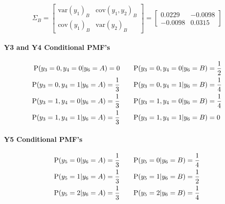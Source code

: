 \documentclass[12pt]{article}
\begin{document}
\begin{enumerate}[leftmargin=\labelsep]
\begin{enumerate}
        \begin{equation}
            \Sigma_B =
            \begin{bmatrix}
                \textrm{var}(y_1)_B & \textrm{cov}(y_1, y_2)_B \\
                \textrm{cov}(y_1)_B & \textrm{var}(y_2)_B
            \end{bmatrix}=
            \begin{bmatrix}
                0.0229 & -0.0098 \\
                -0.0098 & 0.0315
            \end{bmatrix}
        \end{equation}

        \paragraph{Y3 and Y4 Conditional PMF's}

        \begin{equation}
        \begin{split}
            \textrm{P}(y_3 = 0, y_4 = 0 | y_6 = A) = 0 &\qquad \textrm{P}(y_3 = 0, y_4 = 0 | y_6 = B) = \frac{1}{2} \\
            \textrm{P}(y_3 = 0, y_4 = 1 | y_6 = A) = \frac{1}{3} &\qquad \textrm{P}(y_3 = 0, y_4 = 1 | y_6 = B) = \frac{1}{4} \\
            \textrm{P}(y_3 = 1, y_4 = 0 | y_6 = A) = \frac{1}{3} &\qquad \textrm{P}(y_3 = 1, y_4 = 0 | y_6 = B) = \frac{1}{4} \\
            \textrm{P}(y_3 = 1, y_4 = 1 | y_6 = A) = \frac{1}{3} &\qquad \textrm{P}(y_3 = 1, y_4 = 1 | y_6 = B) = 0
        \end{split}
        \end{equation}

        \paragraph{Y5 Conditional PMF's}

        \begin{equation}
        \begin{split}
            \textrm{P}(y_5 = 0 | y_6 = A) = \frac{1}{3} &\qquad \textrm{P}(y_5 = 0 | y_6 = B) = \frac{1}{4} \\
            \textrm{P}(y_5 = 1 | y_6 = A) = \frac{1}{3} &\qquad \textrm{P}(y_5 = 1 | y_6 = B) = \frac{1}{2} \\
            \textrm{P}(y_5 = 2 | y_6 = A) = \frac{1}{3} &\qquad \textrm{P}(y_5 = 2 | y_6 = B) = \frac{1}{4}
        \end{split}
        \end{equation}


\end{enumerate}
\end{enumerate}
\end{document}
